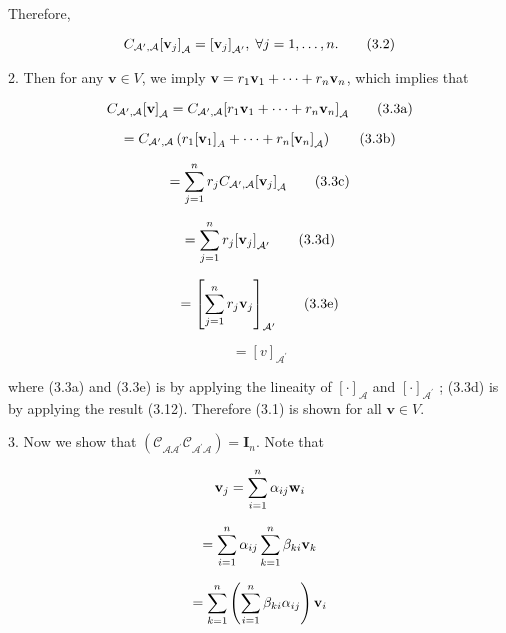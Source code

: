 \documentclass[11pt]{article}
\begin{document}
Therefore,

\[
{C}_{{\mathcal{A}}^{\prime },\mathcal{A}}{\left\lbrack  {\bf v}_{j}\right\rbrack  }_{\mathcal{A}} = {\left\lbrack  {\bf v}_{j}\right\rbrack  }_{{\mathcal{A}}^{\prime }},\;\forall j = 1,\ldots ,n. \tag{3.2}
\]

2. Then for any \(\mathbf{v} \in  V\), we imply \(\mathbf{v} = {r}_1{\bf v}_1 + \cdots  + {r}_n{\bf v}_n\), which implies that

\[
{C}_{{\mathcal{A}}^{\prime },\mathcal{A}}{\left\lbrack  \mathbf{v}\right\rbrack  }_{\mathcal{A}} = {C}_{{\mathcal{A}}^{\prime },\mathcal{A}}{\left\lbrack  {r}_1{\bf v}_1 + \cdots  + {r}_n{\bf v}_n\right\rbrack  }_{\mathcal{A}} \tag{3.3a}
\]

\[
= {C}_{{\mathcal{A}}^{\prime },\mathcal{A}}\left( {{r}_1{\left\lbrack  {\bf v}_1\right\rbrack  }_{A} + \cdots  + {r}_n{\left\lbrack  {\bf v}_n\right\rbrack  }_{\mathcal{A}}}\right)  \tag{3.3b}
\]

\[
= \mathop{\sum }\limits_{{j = 1}}^n{r}_{j}{C}_{{\mathcal{A}}^{\prime },\mathcal{A}}{\left\lbrack  {\bf v}_{j}\right\rbrack  }_{\mathcal{A}} \tag{3.3c}
\]

\[
= \mathop{\sum }\limits_{{j = 1}}^n{r}_{j}{\left\lbrack  {\bf v}_{j}\right\rbrack  }_{{\mathcal{A}}^{\prime }} \tag{3.3d}
\]

\[
= {\left\lbrack  \mathop{\sum }\limits_{{j = 1}}^n{r}_{j}{\bf v}_{j}\right\rbrack  }_{{\mathcal{A}}^{\prime }} \tag{3.3e}
\]

\[
= {\left\lbrack  v\right\rbrack  }_{{\mathcal{A}}^{\prime }} \tag{3.3f}
\]

where (3.3a) and (3.3e) is by applying the lineaity of \({\left\lbrack  \cdot \right\rbrack  }_{\mathcal{A}}\) and \({\left\lbrack  \cdot \right\rbrack  }_{{\mathcal{A}}^{\prime }}\) ; (3.3d) is by applying the result (3.12). Therefore (3.1) is shown for all \(\mathbf{v} \in  V\).

3. Now we show that \(\left( {{\mathcal{C}}_{\mathcal{A}{\mathcal{A}}^{\prime }}{\mathcal{C}}_{{\mathcal{A}}^{\prime }\mathcal{A}}}\right)  = {\mathbf{I}}_n\). Note that

\[
{\bf v}_{j} = \mathop{\sum }\limits_{{i = 1}}^n\alpha_{ij}{\bf w}_{i}
\]

\[
= \mathop{\sum }\limits_{{i = 1}}^n\alpha_{ij}\mathop{\sum }\limits_{{k = 1}}^n\beta_{ki}{\bf v}_{k}
\]

\[
= \mathop{\sum }\limits_{{k = 1}}^n\left( {\mathop{\sum }\limits_{{i = 1}}^n\beta_{ki}\alpha_{ij}}\right) {\bf v}_{i}
\]
\end{document}

